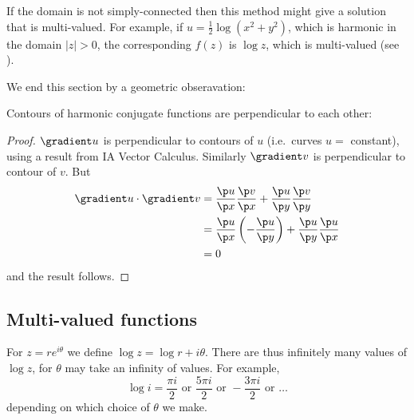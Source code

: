\documentclass[a4paper]{article}
\begin{document}
If the domain is not simply-connected then this method might give a solution that is multi-valued. For example, if \(u = \frac{1}{2} \log(x^2 + y^2)\), which is harmonic in the domain \(|z| > 0\), the corresponding \(f(z)\) is \(\log z\), which is multi-valued (see ).

We end this section by a geometric obseravation:

\begin{proposition}
  Contours of harmonic conjugate functions are perpendicular to each other:
\end{proposition}

\begin{proof}
  \(\gradient u\) is perpendicular to contours of \(u\) (i.e.\ curves \(u = \) constant), using a result from IA Vector Calculus. Similarly \(\gradient v\) is perpendicular to contour of \(v\). But
  \begin{align*}
    \gradient u \cdot \gradient v &= \frac{\p u}{\p x}\frac{\p v}{\p x} + \frac{\p u}{\p y}\frac{\p v}{\p y} \\
                                  &= \frac{\p u}{\p x}\left(-\frac{\p u}{\p y}\right) + \frac{\p u}{\p y}\frac{\p u}{\p x} \\
                                  &= 0
  \end{align*}
  and the result follows.
\end{proof}

\subsection{Multi-valued functions}\label{sec:multi-valued functions}

For \(z = re^{i\theta}\) we define \(\log z = \log r + i\theta\). There are thus infinitely many values of \(\log z\), for \(\theta\) may take an infinity of values. For example,
\[
  \log i = \frac{\pi i}{2} \text{ or } \frac{5\pi i}{2} \text{ or } -\frac{3\pi i}{2} \text{ or } \dots
\]
depending on which choice of \(\theta\) we make.
\end{document}
